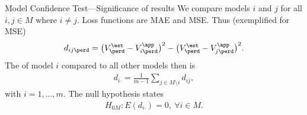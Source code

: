 \begin{frame}[noframenumbering]{Model Confidence Test---Significance of results}%
	We compare models $i$ and $j$ for all $i,j \in M $ where $i \neq j$. \newline  %
	\smallskip
	Loss functions are MAE and MSE. \newline%
	\smallskip
	Thus (exemplified for MSE)
	\begin{align*}
		d_{ij \perd} = \bigl( V^{\est}_\perd - V^{\app}_{i \perd} \bigr)^{2} - \bigl( V^{\est}_\perd - V^{\app}_{j \perd} \bigr)^{2}.%
	\end{align*}
	The  of model $i$ compared to all other models then is
	\begin{align*}
		d_{i \boldsymbol{\cdot}} = \frac{1}{m-1} \sum_{j \in M \setminus i} d_{ij},%
	\end{align*}
	with $i = 1,...,m$. %
	The null hypothesis states %
	\begin{align*}
		H_{0M}: E(d_{i \boldsymbol{\cdot}}) = 0,\ \forall i \in M. %
	\end{align*}  
\end{frame}
	
%	

